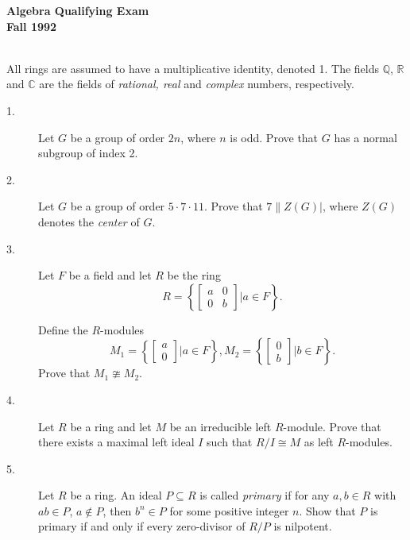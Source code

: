 \documentclass{article}
\def\R{\mathbb R}
\def\C{\mathbb C}
\def\Q{\mathbb Q}
\begin{document}



\begin{center}\begin{LARGE}
{\bf Algebra Qualifying Exam}\\ 
{\bf Fall 1992}\\ \end{LARGE}
\end{center}
\vspace{0.1in}
\noindent\hrulefill\\

All rings are assumed to have a multiplicative identity, denoted 1. The
fields $\Q$, $\R$ and $\C$ are the fields of {\it rational, real} and
{\it complex} numbers, respectively.

\begin{description}

\item[1.]
Let $G$ be a group of order $2n$, where $n$ is odd. Prove that $G$ has
a normal subgroup of index 2.

\item[2.]
Let $G$ be a group of order $5 \cdot 7 \cdot 11$. Prove that
$7 \parallel Z(G)|$, where $Z(G)$ denotes the {\it center} of $G$.

\item[3.]
Let $F$ be a field and let $R$ be the ring
$$R= \left\{ \begin{bmatrix} a&0 \\ 0&b \end{bmatrix} | a \in F \right\}.$$

Define the $R$-modules
$$M_1 = \left\{\begin{bmatrix} a \\ 0 \end{bmatrix} | a \in F \right\},
  M_2 = \left\{\begin{bmatrix} 0 \\ b \end{bmatrix} | b \in F \right\}.$$
Prove that $M_1 \ncong M_2$.

\item[4.]
Let $R$ be a ring and let $M$ be an irreducible left $R$-module. Prove
that there exists a maximal left ideal $I$ such that
$R/I \cong M$ as left $R$-modules.

\item[5.]
Let $R$ be a ring. An ideal $P \subseteq R$ is called {\it primary} if for
any $a,b \in R$ with $ab \in P$, $a \notin P$, then $b^n \in P$ for some
positive integer $n$. Show that $P$ is primary if and only if every
zero-divisor of $R/P$ is nilpotent.


\end{description}
\end{document}
